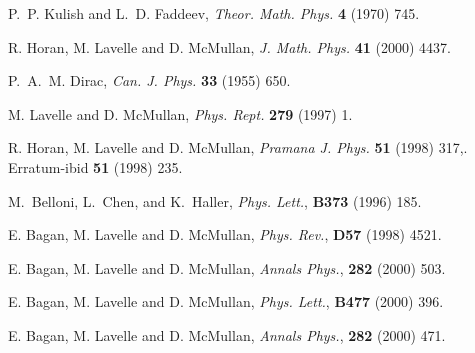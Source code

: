\documentclass[12pt,a4paper]{article}
\begin{document}
\begin{thebibliography}{10}

P.~P. Kulish and L.~D. Faddeev, {\em Theor. Math. Phys.} \textbf{4} (1970) 745.

R. Horan, M. Lavelle and D. McMullan, {\em J. Math. Phys.} {\bf 41} (2000) 4437.

P.~A.~M. Dirac, {\em Can. J. Phys.} \textbf{33} (1955) 650.

M. Lavelle and D. McMullan, {\em Phys. Rept.} \textbf{279} (1997) 1.

R. Horan, M. Lavelle and D. McMullan,
{\em Pramana J. Phys.} \textbf{51} (1998) 317,.
 Erratum-ibid \textbf{51} (1998) 235.

M.~Belloni, L.~Chen, and K.~Haller, {\em Phys. Lett.}, \textbf{B373}  (1996) 185.

E. Bagan, M. Lavelle and D. McMullan, {\em Phys. Rev.}, \textbf{D57} (1998) 4521.

E. Bagan, M. Lavelle and D. McMullan, {\em  Annals Phys.}, \textbf{282} (2000) 503.

E. Bagan, M. Lavelle and D. McMullan, {\em Phys. Lett.}, \textbf{B477} (2000) 396.

E. Bagan, M. Lavelle and D. McMullan, {\em  Annals Phys.}, \textbf{282}  (2000) 471.

\end{thebibliography}
\end{document}
